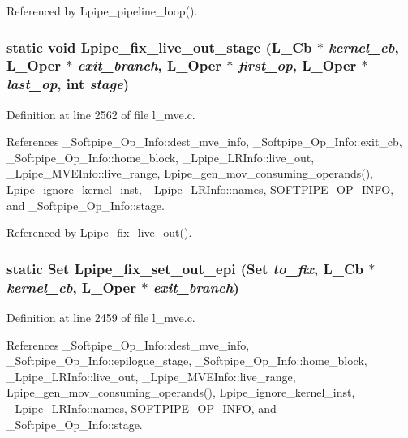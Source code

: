 Referenced by Lpipe\_\-pipeline\_\-loop().
\subsubsection{\setlength{\rightskip}{0pt plus 5cm}static void Lpipe\_\-fix\_\-live\_\-out\_\-stage (L\_\-Cb $\ast$ {\em kernel\_\-cb}, L\_\-Oper $\ast$ {\em exit\_\-branch}, L\_\-Oper $\ast$ {\em first\_\-op}, L\_\-Oper $\ast$ {\em last\_\-op}, int {\em stage})\hspace{0.3cm}{\tt  [static]}}\label{l__mve_8c_e88028a00126e6131b9cc667b88f86bb}




Definition at line 2562 of file l\_\-mve.c.

References \_\-Softpipe\_\-Op\_\-Info::dest\_\-mve\_\-info, \_\-Softpipe\_\-Op\_\-Info::exit\_\-cb, \_\-Softpipe\_\-Op\_\-Info::home\_\-block, \_\-Lpipe\_\-LRInfo::live\_\-out, \_\-Lpipe\_\-MVEInfo::live\_\-range, Lpipe\_\-gen\_\-mov\_\-consuming\_\-operands(), Lpipe\_\-ignore\_\-kernel\_\-inst, \_\-Lpipe\_\-LRInfo::names, SOFTPIPE\_\-OP\_\-INFO, and \_\-Softpipe\_\-Op\_\-Info::stage.

Referenced by Lpipe\_\-fix\_\-live\_\-out().
\subsubsection{\setlength{\rightskip}{0pt plus 5cm}static Set Lpipe\_\-fix\_\-set\_\-out\_\-epi (Set {\em to\_\-fix}, L\_\-Cb $\ast$ {\em kernel\_\-cb}, L\_\-Oper $\ast$ {\em exit\_\-branch})\hspace{0.3cm}{\tt  [static]}}\label{l__mve_8c_f6ff4bb1935ebcb64fec63d238e51fa0}




Definition at line 2459 of file l\_\-mve.c.

References \_\-Softpipe\_\-Op\_\-Info::dest\_\-mve\_\-info, \_\-Softpipe\_\-Op\_\-Info::epilogue\_\-stage, \_\-Softpipe\_\-Op\_\-Info::home\_\-block, \_\-Lpipe\_\-LRInfo::live\_\-out, \_\-Lpipe\_\-MVEInfo::live\_\-range, Lpipe\_\-gen\_\-mov\_\-consuming\_\-operands(), Lpipe\_\-ignore\_\-kernel\_\-inst, \_\-Lpipe\_\-LRInfo::names, SOFTPIPE\_\-OP\_\-INFO, and \_\-Softpipe\_\-Op\_\-Info::stage.


